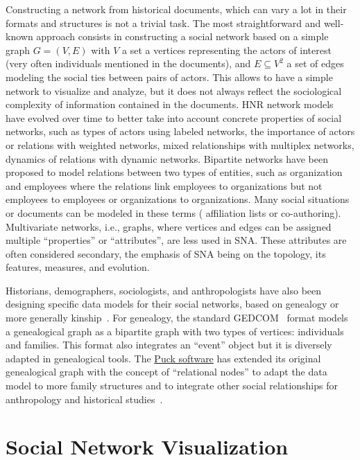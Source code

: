Constructing a network from historical documents, which can vary a lot in their formats and structures is not a trivial task.
The most straightforward and well-known approach consists in constructing a social network based on a simple graph $G = (V, E)$ with $V$ a set a vertices representing the actors of interest (very often individuals mentioned in the documents), and $E \subseteq V^2$ a set of edges modeling the social ties between pairs of actors.
This allows to have a simple network to visualize and analyze, but it does not always reflect the sociological complexity of information contained in the documents.
HNR network models have evolved over time to better take into account concrete properties of social networks, such as types of actors using labeled networks, the importance of actors or relations with weighted networks, mixed relationships with multiplex networks, dynamics of relations with dynamic networks.
Bipartite networks have been proposed to model relations between two types of entities, such as organization and employees where the relations link employees to organizations but not employees to employees or organizations to organizations.
Many social situations or documents can be modeled in these terms (%
affiliation lists or co-authoring).
Multivariate networks, i.e.,  graphs, where vertices and edges can be assigned multiple ``properties'' or ``attributes'', are less used in SNA\@.
These attributes are often considered secondary, the emphasis of SNA being on the topology, its features, measures, and evolution.

Historians, demographers, sociologists, and anthropologists have also been designing specific data models for their social networks, based on genealogy or more generally kinship~\cite{hamberger:halshs-00658667}.
For genealogy, the standard GEDCOM~\cite{gedcom} format models a genealogical graph as a bipartite graph with two types of vertices: individuals and families.
This format also integrates an ``event'' object but it is diversely adapted in genealogical tools.
The \href{https://www.kintip.net/}{Puck software} has extended its original genealogical graph with the concept of ``relational nodes'' to adapt the data model to more family structures and to integrate other social relationships for anthropology and historical studies~\cite{hambergerScanningPatternsRelationship2014}.


\section{Social Network Visualization}

